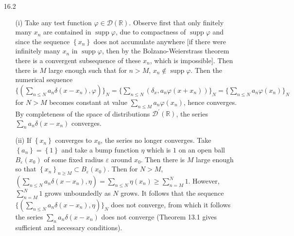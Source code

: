 \documentclass[11pt]{article}
\newcommand{\cbr}[1]{\left\{#1\right\}}
\DeclareMathOperator{\supp}{supp}
\begin{document}
\begin{enumerate}
    \item[16.2] \begin{enumerate}
        \item[(i)] Take any test function $\varphi\in\mathcal{D}(\mathbb{R})$. Observe first that only finitely many $x_n$ are contained in $\supp\varphi$, due to compactness of $\supp\varphi$ and since the sequence $\cbr{x_n}$ does not accumulate anywhere [if there were infinitely many $x_n$ in $\supp\varphi$, then by the Bolzano-Weierstrass theorem there is a convergent subsequence of these $x_n$, which is impossible]. Then there is $M$ large enough such that for $n>M$, $x_n\not\in\supp\varphi$. Then the numerical sequence $\{(\sum_{n\leq N}a_n\delta(x-x_n),\varphi)\}_N = \{\sum_{n\leq N}(\delta_{x},a_n\varphi(x+x_n))\}_N = \{\sum_{n\leq N}a_n\varphi(x_n)\}_N$ for $N>M$ becomes constant at value $\sum_{n\leq M}a_n\varphi(x_n)$, hence converges. By completeness of the space of distributions $\mathcal{D}^\prime(\mathbb{R})$, the series $\sum_na_n\delta(x-x_n)$ converges.
        \item[(ii)] If $\cbr{x_n}$ converges to $x_0$, the series no longer converges. Take $\cbr{a_n} = \cbr{1}$ and take a bump function $\eta$ which is $1$ on an open ball $B_{\varepsilon}(x_0)$ of some fixed radius $\varepsilon$ around $x_0$. Then there is $M$ large enough so that $\cbr{x_n}_{n\geq M}\subset B_{\varepsilon}(x_0)$. Then for $N>M$, $(\sum_{n\leq N}a_n\delta(x-x_n),\eta) = \sum_{n\leq N}\eta(x_n)\geq \sum_{n = M}^N 1$. However, $\sum_{n = M}^N 1$ grows unboundedly as $N$ grows. It follows that the sequence $\{(\sum_{n\leq N}a_n\delta(x-x_n),\eta)\}_N$ does not converge, from which it follows the series $\sum_na_n\delta(x-x_n)$ does not converge (Theorem 13.1 gives sufficient and necessary conditions).
    \end{enumerate}

    \hrulefill


\end{enumerate}
\end{document}
